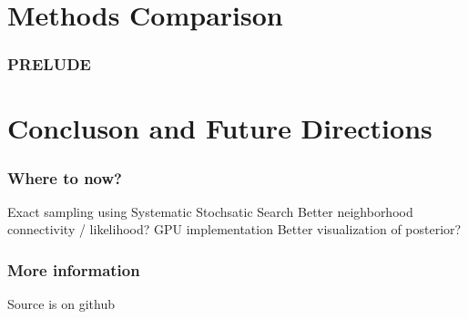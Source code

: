 \documentclass{beamer}
\begin{document}
\section{Methods Comparison}
\begin{frame}
  \frametitle{PRELUDE}
\end{frame}

\section{Concluson and Future Directions}
\begin{frame}
  \frametitle{Where to now?}
  Exact sampling using Systematic Stochsatic Search
  Better neighborhood connectivity / likelihood? 
  GPU implementation 
  Better visualization of posterior?
\end{frame}

\begin{frame}
  \frametitle{More information}
  Source is on github
  
\end{frame}
\end{document}

